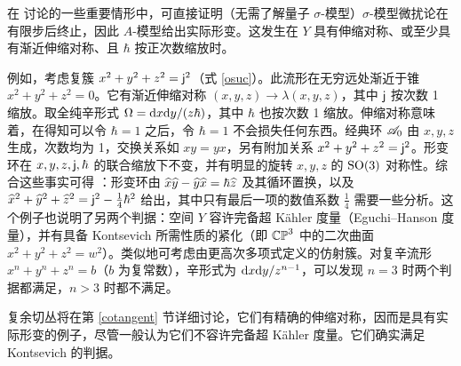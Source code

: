 在 \cite{KW,GW} 讨论的一些重要情形中，可直接证明（无需了解量子 $\sigma$-模型）$\sigma$-模型微扰论在有限步后终止，因此 $A$-模型给出实际形变。这发生在 $Y$ 具有伸缩对称、或至少具有渐近伸缩对称、且 $\hbar$ 按正次数缩放时。

例如，考虑复簇 $x^2+y^2+z^2={\sf j}^2$（式 \eqref{osuc}）。此流形在无穷远处渐近于锥 $x^2+y^2+z^2=0$。它有渐近伸缩对称 $(x,y,z)\to\lambda(x,y,z)$，其中 ${\sf j}$ 按次数 1 缩放。取全纯辛形式 $\Omega={\mathrm d} x{\mathrm d} y/(z\hbar)$，其中 $\hbar$ 也按次数 1 缩放。伸缩对称意味着，在得知可以令 $\hbar=1$ 之后，令 $\hbar=1$ 不会损失任何东西。经典环 ${\mathscr A}_0$ 由 $x,y,z$ 生成，次数均为 1，交换关系如 $xy=yx$，另有附加关系 $x^2+y^2+z^2={\sf j}^2$。形变环在 $x,y,z,{\sf j},\hbar$ 的联合缩放下不变，并有明显的旋转 $x,y,z$ 的 ${\mathrm{SO}}(3)$ 对称性。综合这些事实可得 \cite{GW}：形变环由 $\widehat x\widehat y-\widehat y\widehat x=\hbar\widehat z$ 及其循环置换，以及 $\widehat x^2+\widehat y^2+\widehat z^2={\sf j}^2-\frac14\hbar^2$ 给出，其中只有最后一项的数值系数 $\frac14$ 需要一些分析。这个例子也说明了另两个判据：空间 $Y$ 容许完备超 Kähler 度量（Eguchi--Hanson 度量），并有具备 Kontsevich 所需性质的紧化（即 ${\mathbb{CP}}^3$ 中的二次曲面 $x^2+y^2+z^2=w^2$）。类似地可考虑由更高次多项式定义的仿射簇。对复辛流形 $x^n+y^n+z^n=b$（$b$ 为复常数），辛形式为 ${\mathrm d} x{\mathrm d} y/z^{n-1}$，可以发现 $n=3$ 时两个判据都满足，$n>3$ 时都不满足。

复余切丛将在第 \ref{cotangent} 节详细讨论，它们有精确的伸缩对称，因而是具有实际形变的例子，尽管一般认为它们不容许完备超 Kähler 度量。它们确实满足 Kontsevich 的判据。
